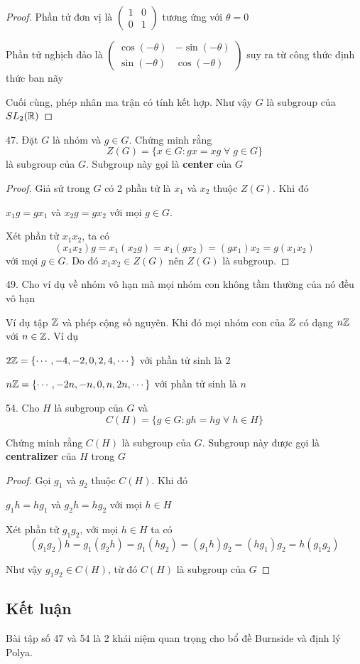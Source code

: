 \begin{proof}
        Phần tử đơn vị là $\begin{pmatrix}
        1 & 0 \\ 0 & 1
        \end{pmatrix}$ tương ứng với $\theta = 0$
        
        Phần tử nghịch đảo là $\begin{pmatrix}
        \cos (-\theta) & -\sin (-\theta) \\ \sin (-\theta) & \cos (-\theta)
        \end{pmatrix}$ suy ra từ công thức định thức ban nãy
        
        Cuối cùng, phép nhân ma trận có tính kết hợp. Như vậy $G$ là subgroup của $SL_2 (\mathbb{R})$
        
\end{proof}

47. Đặt $G$ là nhóm và $g \in G$. Chứng minh rằng $$Z(G) = \{ x \in G: gx = xg \; \forall \; g \in G \}$$ là subgroup của $G$. Subgroup này gọi là \textbf{center} của $G$

\begin{proof}
    Giả sử trong $G$ có 2 phần tử là $x_1$ và $x_2$ thuộc $Z(G)$. Khi đó

        $x_1 g = g x_1$ và $x_2 g = g x_2$ với mọi $g \in G$.

    Xét phần tử $x_1 x_2$, ta có
    $$(x_1 x_2) g = x_1 (x_2 g) = x_1 (g x_2) = (g x_1) x_2 = g (x_1 x_2)$$ với mọi $g \in G$. Do đó $x_1 x_2 \in Z(G)$ nên $Z(G)$ là subgroup.

\end{proof}

49. Cho ví dụ về nhóm vô hạn mà mọi nhóm con không tầm thường của nó đều vô hạn

Ví dụ tập $\mathbb{Z}$ và phép cộng số nguyên. Khi đó mọi nhóm con của $\mathbb{Z}$ có dạng $n\mathbb{Z}$ với $n \in \mathbb{Z}$. Ví dụ

$2\mathbb{Z} = \{\cdots, -4, -2, 0, 2, 4, \cdots\}$ với phần tử sinh là $2$

$n\mathbb{Z} = \{\cdots, -2n, -n, 0, n, 2n, \cdots\}$ với phần tử sinh là $n$

54. Cho $H$ là subgroup của $G$ và $$C(H) = \{g \in G: gh = hg \; \forall \; h \in H\}$$

Chứng minh rằng $C(H)$ là subgroup của $G$. Subgroup này được gọi là \textbf{centralizer} của $H$ trong $G$

\begin{proof}
    Gọi $g_1$ và $g_2$ thuộc $C(H)$. Khi đó

    $g_1 h = h g_1$ và $g_2 h = h g_2$ với mọi $h \in H$

    Xét phần tử $g_1 g_2$, với mọi $h \in H$ ta có
    $$(g_1 g_2) h = g_1 (g_2 h) = g_1 (h g_2) = (g_1 h) g_2 = (h g_1) g_2 = h (g_1 g_2)$$

    Như vậy $g_1 g_2 \in C(H)$, từ đó $C(H)$ là subgroup của $G$


\end{proof}

\subsection{Kết luận}

Bài tập số 47 và 54 là 2 khái niệm quan trọng cho bổ đề Burnside và định lý Polya.

